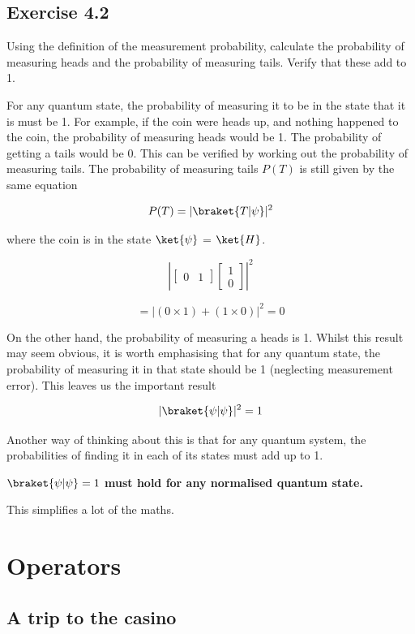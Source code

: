 \documentclass{book}
\begin{document}
\subsection{Exercise 4.2}

Using the definition of the measurement probability, calculate the probability of measuring heads and the probability of measuring tails. Verify that these add to 1. 
  


For any quantum state, the probability of measuring it to be in the state that it is must be 1. For example, if the coin were heads up, and nothing happened to the coin, the probability of measuring heads would be 1. The probability of getting a tails would be 0. This can be verified by working out the probability of measuring tails. The probability of measuring tails $P(T)$ is still given by the same equation 

$$ P(T) = |\braket{T|\psi}|^2 $$ 

where the coin is in the state $\ket{\psi}$ = $\ket{H}$. 

$$  
\left| \begin{bmatrix} 0 & 1 \end{bmatrix} \begin{bmatrix} 1 \\ 0 \end{bmatrix} \right|^2 
$$

$$
= \left| (0 \times 1) + (1 \times 0) \right|^2 = 0 
$$

On the other hand, the probability of measuring a heads is 1. Whilst this result may seem obvious, it is worth emphasising that for any quantum state, the probability of measuring it in that state should be 1 (neglecting measurement error). This leaves us the important result

$$ |\braket{\psi|\psi}|^2 = 1 $$

Another way of thinking about this is that for any quantum system, the probabilities of finding it in each of its states must add up to 1. 

\textbf{$ \braket{\psi|\psi} = 1 $ must hold for any normalised quantum state.}

This simplifies a lot of the maths. 

\section{ Operators }

\subsection{ A trip to the casino}
\end{document}

